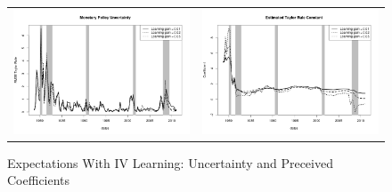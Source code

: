 \documentclass[12pt]{article}
\begin{document}
\begin{figure}\caption{Expectations With IV Learning: Uncertainty and Preceived Coefficients}\label{fg:coefs_iv}\vspace*{1pc}
\hspace*{-0.6in}\begin{tabular}{cc}
\includegraphics[scale=0.4]{mpu_iv.png} & \includegraphics[scale=0.4]{coef_constant_iv.png} \\ [1pc]

\end{tabular}
\end{figure}
\end{document}
